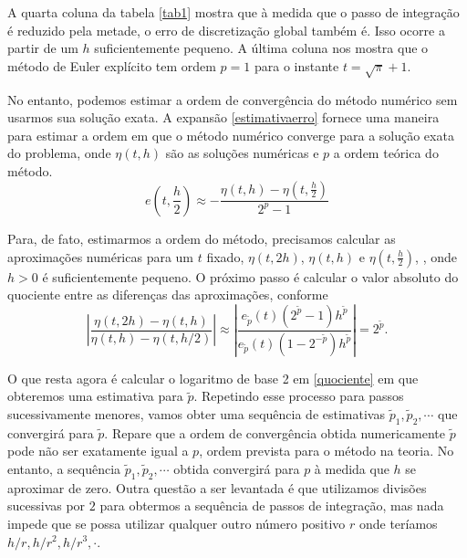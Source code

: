 \documentclass[amsmath,amssymb,floatfix]{revtex4}
\begin{document}
A quarta coluna da tabela \ref{tab1} mostra que à medida que o passo de integração é reduzido pela metade, o erro de discretização global também é. Isso ocorre a partir de um $h$ suficientemente pequeno. A última coluna nos mostra que o método de Euler explícito tem ordem $p =1$ para o instante $t = \sqrt{\pi} +1$. 

No entanto, podemos estimar a ordem de convergência do método numérico sem usarmos sua solução exata. A expansão \eqref{estimativaerro} fornece uma maneira para estimar a ordem em que o método numérico converge para a solução exata do problema, onde $\eta(t,h)$ são as soluções numéricas e $p$ a ordem teórica do método. 
\begin{equation}\label{estimativaerro}
e(t,\frac{h}{2}) \approx - \frac{\eta (t,h) - \eta(t,\frac{h}{2}) }{2^p -1}
\end{equation}

Para, de fato, estimarmos a ordem do método, precisamos calcular as aproximações numéricas para um $t$ fixado, $\eta(t,2h)$, $\eta(t,h)$ e $\eta(t,\frac{h}{2})$, , onde $h> 0$ é suficientemente pequeno. O próximo passo é calcular o valor absoluto do quociente entre as diferenças das aproximações, conforme
\begin{equation}\label{quociente}
\left| \frac{\eta(t,2h) - \eta(t,h)}{\eta(t,h) - \eta(t,h/2)} \right| \approx \left| \frac{e_{\tilde{p}}(t)(2^{\tilde{p}}-1)h^{\tilde{p}}}{e_{\tilde{p}}(t)(1-2^{-\tilde{p}})h^{\tilde{p}}} \right| = 2^{\tilde{p}}.
\end{equation}

O que resta agora é calcular o logaritmo de base 2 em \eqref{quociente} em que obteremos uma estimativa para $\tilde{p}$. Repetindo esse processo para passos sucessivamente menores, vamos obter uma sequência de estimativas $\tilde{p}_1, \tilde{p}_2, \cdots$ que convergirá para $\tilde{p}$. Repare que a ordem de convergência obtida numericamente $\tilde{p}$ pode não ser exatamente igual a $p$, ordem prevista para o método na teoria. No entanto, a sequência $\tilde{p}_1, \tilde{p}_2, \cdots$ obtida convergirá para $p$ à medida que $h$ se aproximar de zero. Outra questão a ser levantada é que utilizamos divisões sucessivas por $2$ para obtermos a sequência de passos de integração, mas nada impede que se possa utilizar qualquer outro número positivo $r$ onde teríamos $h/r, h/r^2, h/r^3, \cdot$. 
\end{document}

